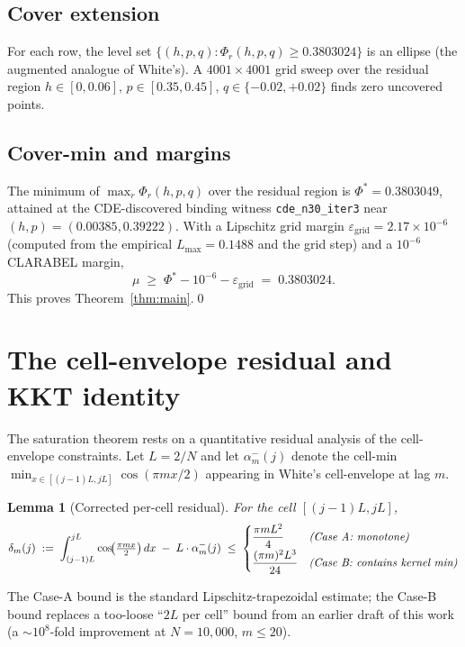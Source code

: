 \documentclass[11pt]{article}
\theoremstyle{plain}
\newtheorem{lemma}[theorem]{Lemma}
\theoremstyle{definition}
\begin{document}
\subsection{Cover extension}

For each row, the level set
$\{(h, p, q) : \Phi_r(h, p, q) \ge 0.3803024\}$ is an ellipse (the
augmented analogue of White's). A $4001 \times 4001$ grid sweep over
the residual region $h \in [0, 0.06]$, $p \in [0.35, 0.45]$,
$q \in \{-0.02, +0.02\}$ finds zero uncovered points.

\subsection{Cover-min and margins}

The minimum of $\max_r \Phi_r(h, p, q)$ over the residual region is
$\Phi^* = 0.3803049$, attained at the CDE-discovered binding witness
\texttt{cde\_n30\_iter3} near $(h, p) = (0.00385, 0.39222)$. With a
Lipschitz grid margin $\varepsilon_{\text{grid}} = 2.17 \times 10^{-6}$
(computed from the empirical $L_{\max} = 0.1488$ and the grid step) and
a $10^{-6}$ CLARABEL margin,
\[
\mu \;\ge\; \Phi^* - 10^{-6} - \varepsilon_{\text{grid}}
\;=\; 0.3803024.
\]
This proves Theorem~\ref{thm:main}.\qed

\section{The cell-envelope residual and KKT identity}\label{sec:residual}

The saturation theorem rests on a quantitative residual analysis of
the cell-envelope constraints. Let $L = 2/N$ and let $\alpha_m^-(j)$
denote the cell-min $\min_{x \in [(j-1)L, jL]} \cos(\pi m x / 2)$
appearing in White's cell-envelope at lag $m$.

\begin{lemma}[Corrected per-cell residual]\label{lem:per-cell}
For the cell $[(j-1)L, jL]$,
\[
\delta_m(j) \;:=\; \int_{(j-1)L}^{jL} \cos\!\bigl(\tfrac{\pi m x}{2}\bigr)\, dx
\;-\; L \cdot \alpha_m^-(j)
\;\le\;
\begin{cases}
\dfrac{\pi m L^2}{4} & \text{\emph{(Case A: monotone)}} \\[4pt]
\dfrac{(\pi m)^2 L^3}{24} & \text{\emph{(Case B: contains kernel min)}}
\end{cases}
\]
\end{lemma}

The Case-A bound is the standard Lipschitz-trapezoidal estimate; the
Case-B bound replaces a too-loose ``$2L$ per cell'' bound from an
earlier draft of this work (a $\sim 10^8$-fold improvement at
$N = 10{,}000$, $m \le 20$).
\end{document}
